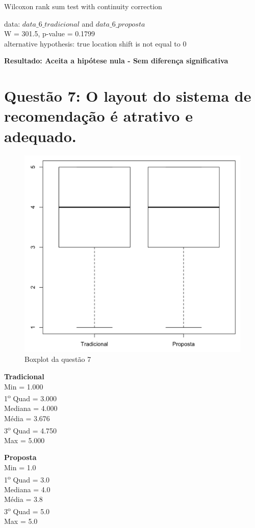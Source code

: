 Wilcoxon rank sum test with continuity correction

\noindent
data:  $data\_6\_tradicional$ and $data\_6\_proposta$\\
W = 301.5, p-value = 0.1799\\
alternative hypothesis: true location shift is not equal to 0

\noindent
\textbf{Resultado: Aceita a hipótese nula - Sem diferença significativa}

\newpage
\section{Questão 7: O layout do sistema de recomendação é atrativo e adequado.}

\begin{figure}[htb]
  \caption{\label{fig:questao7-boxplot}Boxplot da questão 7}
  \begin{center}
      \includegraphics[scale=0.4]{./Figuras/questao7-boxplot.png}
  \end{center}
\end{figure}

\begin{multicols}{2}

\noindent\textbf{Tradicional}\\
Min = 1.000\\
1\textsuperscript{o} Quad = 3.000\\
Mediana = 4.000\\
Média = 3.676\\
3\textsuperscript{o} Quad = 4.750\\
Max = 5.000\\
\columnbreak

\noindent\textbf{Proposta}\\
Min = 1.0\\
1\textsuperscript{o} Quad = 3.0\\
Mediana = 4.0\\
Média = 3.8\\
3\textsuperscript{o} Quad = 5.0\\
Max = 5.0
\end{multicols}

